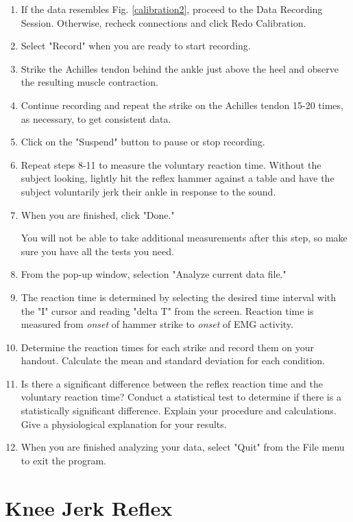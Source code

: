 \documentclass{article}
\begin{document}
\begin{enumerate}
	\item If the data resembles Fig. \ref{calibration2}, proceed to the Data Recording Session. Otherwise, recheck connections and click Redo Calibration.
	\item Select "Record" when you are ready to start recording.
	\item Strike the Achilles tendon behind the ankle just above the heel and observe the resulting muscle contraction.
	\item Continue recording and repeat the strike on the Achilles tendon 15-20 times, as necessary, to get consistent data.
	\item Click on the "Suspend" button to pause or stop recording.
	\item Repeat steps 8-11 to measure the voluntary reaction time. Without the subject looking, lightly hit the reflex hammer against a table and have the subject voluntarily jerk their ankle in response to the sound.
	\item When you are finished, click "Done."
	\begin{warn}
		You will not be able to take additional measurements	 after this step, so make sure you have all the tests you need.
	\end{warn}
	\item From the pop-up window, selection "Analyze current data file."
	\item The reaction time is determined by selecting the desired time interval with the "I" cursor and reading "delta T" from the screen. Reaction time is measured from \textit{onset} of hammer strike to \textit{onset} of EMG activity.
	\item Determine the reaction times for each strike and record them on your handout. Calculate the mean and standard deviation for each condition.
	\item Is there a significant difference between the reflex reaction time and the voluntary reaction time? Conduct a statistical test to determine if there is a statistically significant difference. Explain your procedure and calculations. Give a physiological explanation for your results.
	\item When you are finished analyzing your data, select "Quit" from the File menu to exit the program.
\end{enumerate}

\section*{Knee Jerk Reflex}
\end{document}

